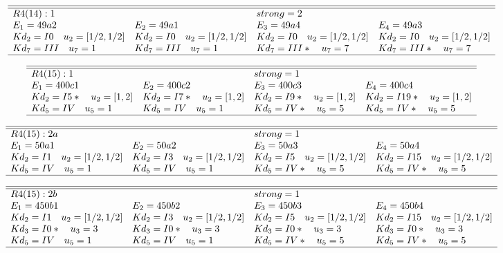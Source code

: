 \documentclass[11pt]{article}
\theoremstyle{definition}
\begin{document}
$$
 \begin{array}{llll}
 \hline 
\hline 
  R4(14):1  &   & strong=2\\
 E_1=49a2 & E_2=49a1 & E_3=49a4 & E_4=49a3 \\
  Kd_{2}=I0\quad u_{2}=[ 1/2, 1/2 ]&  Kd_{2}=I0\quad u_{2}=[ 1/2, 1/2 ]&  Kd_{2}=I0\quad u_{2}=[ 1/2, 1/2 ]&  Kd_{2}=I0\quad u_{2}=[ 1/2, 1/2 ]\\
  Kd_{7}=III\quad u_{7}=1&  Kd_{7}=III\quad u_{7}=1&  Kd_{7}=III*\quad u_{7}=7&  Kd_{7}=III*\quad u_{7}=7\\
\hline
\end{array}
 $$


$$
 \begin{array}{llll}
 \hline 
\hline 
  R4(15):1  &   & strong=1\\
 E_1=400c1 & E_2=400c2 & E_3=400c3 & E_4=400c4 \\
  Kd_{2}=I5*\quad u_{2}=[ 1, 2 ]&  Kd_{2}=I7*\quad u_{2}=[ 1, 2 ]&  Kd_{2}=I9*\quad u_{2}=[ 1, 2 ]&  Kd_{2}=I19*\quad u_{2}=[ 1, 2 ]\\
  Kd_{5}=IV\quad u_{5}=1&  Kd_{5}=IV\quad u_{5}=1&  Kd_{5}=IV*\quad u_{5}=5&  Kd_{5}=IV*\quad u_{5}=5\\
\hline
\end{array}
 $$


$$
 \begin{array}{llll}
 \hline 
\hline 
  R4(15):2a  &   & strong=1\\
 E_1=50a1 & E_2=50a2 & E_3=50a3 & E_4=50a4 \\
  Kd_{2}=I1\quad u_{2}=[ 1/2, 1/2 ]&  Kd_{2}=I3\quad u_{2}=[ 1/2, 1/2 ]&  Kd_{2}=I5\quad u_{2}=[ 1/2, 1/2 ]&  Kd_{2}=I15\quad u_{2}=[ 1/2, 1/2 ]\\
  Kd_{5}=IV\quad u_{5}=1&  Kd_{5}=IV\quad u_{5}=1&  Kd_{5}=IV*\quad u_{5}=5&  Kd_{5}=IV*\quad u_{5}=5\\
\hline
\end{array}
 $$


$$
 \begin{array}{llll}
 \hline 
\hline 
  R4(15):2b  &   & strong=1\\
 E_1=450b1 & E_2=450b2 & E_3=450b3 & E_4=450b4 \\
  Kd_{2}=I1\quad u_{2}=[ 1/2, 1/2 ]&  Kd_{2}=I3\quad u_{2}=[ 1/2, 1/2 ]&  Kd_{2}=I5\quad u_{2}=[ 1/2, 1/2 ]&  Kd_{2}=I15\quad u_{2}=[ 1/2, 1/2 ]\\
  Kd_{3}=I0*\quad u_{3}=3&  Kd_{3}=I0*\quad u_{3}=3&  Kd_{3}=I0*\quad u_{3}=3&  Kd_{3}=I0*\quad u_{3}=3\\
  Kd_{5}=IV\quad u_{5}=1&  Kd_{5}=IV\quad u_{5}=1&  Kd_{5}=IV*\quad u_{5}=5&  Kd_{5}=IV*\quad u_{5}=5\\
\hline
\end{array}
 $$
\end{document}
